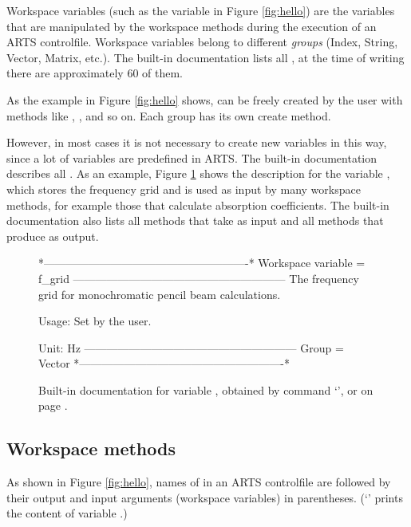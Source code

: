 Workspace variables (such as the variable  in Figure
\ref{fig:hello}) are the variables that are manipulated by the
workspace methods during the execution of an ARTS
controlfile. Workspace variables belong to different \emph{groups}
(Index, String, Vector, Matrix, etc.). The built-in documentation
lists all , at the time of writing there are
approximately 60 of them.

As the example in Figure \ref{fig:hello} shows,  can be freely created by the user with methods like
, , and so on.
Each group has its own create method.

However, in most cases it is not necessary to create new variables in
this way, since a lot of variables are predefined in ARTS. The
built-in documentation describes all . As an example, Figure \ref{fig:f_grid} shows the
description for the variable , which stores the
frequency grid and is used as input by many workspace methods, for
example those that calculate absorption coefficients. The built-in
documentation also lists all methods that take  as
input and all methods that produce  as output.

\begin{figure}
\begin{code}
*-------------------------------------------------------*
Workspace variable = f_grid
---------------------------------------------------------
The frequency grid for monochromatic pencil beam 
calculations.

Usage: Set by the user.
 
Unit:  Hz
---------------------------------------------------------
Group = Vector
*-------------------------------------------------------*
\end{code}
\caption{Built-in documentation for variable , obtained by
  command `', or on page
  .}
\label{fig:f_grid}
\end{figure}

\subsection{Workspace methods}
%
As shown in Figure \ref{fig:hello}, names of  in an ARTS
controlfile are followed by their output and input arguments (workspace
variables) in parentheses. (`' prints the content of variable
.)

